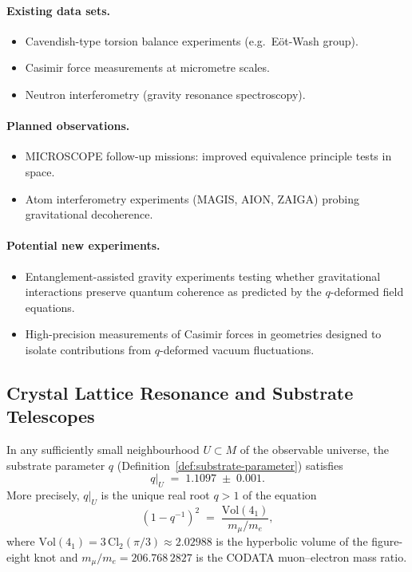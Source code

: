 \paragraph{Existing data sets.}
\begin{itemize}
  \item Cavendish-type torsion balance experiments (e.g.\ E\"ot-Wash group).
  \item Casimir force measurements at micrometre scales.
  \item Neutron interferometry (gravity resonance spectroscopy).
\end{itemize}

\paragraph{Planned observations.}
\begin{itemize}
  \item MICROSCOPE follow-up missions: improved equivalence principle
        tests in space.
  \item Atom interferometry experiments (MAGIS, AION, ZAIGA) probing
        gravitational decoherence.
\end{itemize}

\paragraph{Potential new experiments.}
\begin{itemize}
  \item Entanglement-assisted gravity experiments testing whether
        gravitational interactions preserve quantum coherence as predicted
        by the $q$-deformed field equations.
  \item High-precision measurements of Casimir forces in geometries
        designed to isolate contributions from $q$-deformed vacuum
        fluctuations.
\end{itemize}

\subsection{Crystal Lattice Resonance and Substrate Telescopes}
\label{sec:crystal-resonance}

\begin{proposition}
\label{prop:local-substrate-q}
In any sufficiently small neighbourhood $U \subset M$ of the observable
universe, the substrate parameter $q$
(Definition~\ref{def:substrate-parameter}) satisfies
\[
  q\big|_U \;=\; 1.1097 \;\pm\; 0.001.
\]
More precisely, $q|_U$ is the unique real root $q > 1$ of the equation
\begin{equation}\label{eq:q-determination}
  (1 - q^{-1})^{2}
  \;=\;
  \frac{\mathrm{Vol}(4_1)}{m_\mu / m_e},
\end{equation}
where $\mathrm{Vol}(4_1) = 3\,\mathrm{Cl}_2(\pi/3) \approx 2.02988$ is the
hyperbolic volume of the figure-eight knot and $m_\mu / m_e = 206.768\,2827$
is the CODATA muon--electron mass ratio.
\end{proposition}

